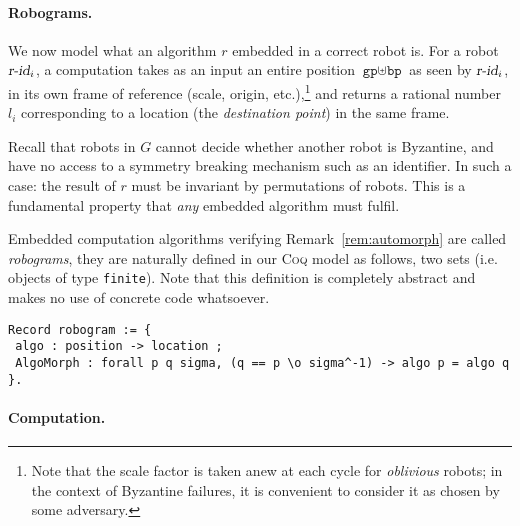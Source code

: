 \documentclass[11pt,a4]{llncs}
\newcommand{\x}{\xspace}
\newcommand{\coq}{\textsc{Coq}\x}
\newcommand{\gp}{\ensuremath{\texttt{gp}\x}}
\newcommand{\bp}{\ensuremath{\texttt{bp}\x}}
\begin{document}
\paragraph*{Robograms.}
We now model what an algorithm $r$ embedded in a correct
robot is.
\newcommand{\robid}{\ensuremath{\textsl{r-id}\x}}
For a robot $\robid_i$, a computation takes as an input an entire
position $\gp \uplus \bp$ as seen by $\robid_i$, in its own frame of
reference (scale, origin, etc.),\footnote{Note that the scale factor is taken 
  anew at each cycle for \emph{oblivious} robots; in the context of Byzantine failures, it is
  convenient to consider it as chosen by some adversary.\label{foot:adversary}} and returns a rational number $l_i$
corresponding to a location (the \emph{destination point}) in the same frame.

\begin{remark}\label{rem:automorph}
  Recall that robots in $G$ cannot decide whether another robot is
  Byzantine, and have no access to a symmetry breaking mechanism such
  as an identifier. In such a case: the result of $r$ must be invariant by
  permutations of robots. This is a fundamental property that
  \emph{any} embedded algorithm must fulfil.
\end{remark}

Embedded computation algorithms verifying Remark~\ref{rem:automorph}
are called \emph{robograms}, they are naturally defined in our \coq
model as follows, two sets (i.e. objects of type
\lstinline!finite!).
Note that this definition is completely abstract and makes no use of
concrete code whatsoever.
\begin{lstlisting}
Record robogram := {
 algo : position -> location ;
 AlgoMorph : forall p q sigma, (q == p \o sigma^-1) -> algo p = algo q }.
\end{lstlisting}

\paragraph*{Computation.}\label{sec:formal-computation}
\end{document}

